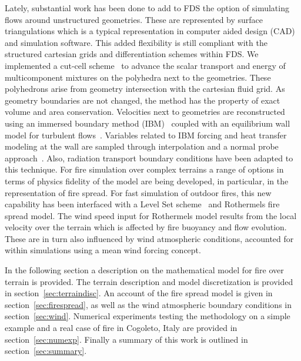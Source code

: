 \documentclass[journal,article,atmosphere,submit,moreauthors,pdftex]{Definitions/mdpi}
\begin{document}
Lately, substantial work has been done to add to FDS the option of simulating flows around unstructured geometries. These are represented by surface triangulations which is a typical representation in computer aided design (CAD) and simulation software. This added flexibility is still compliant with the structured cartesian grids and differentiation schemes within FDS. We implemented a cut-cell scheme~\cite{berger_2016} to advance the scalar transport and energy of multicomponent mixtures on the polyhedra next to the geometries. These polyhedrons arise from geometry intersection with the cartesian fluid grid. As geometry boundaries are not changed, the method has the property of exact volume and area conservation. Velocities next to geometries are reconstructed using an immersed boundary method (IBM)~\cite{fadlun_2000,balaras_2004} coupled with an equilibrium wall model for turbulent flows~\cite{mcdermo_2018}. Variables related to IBM forcing and heat transfer modeling at the wall are sampled through interpolation and a normal probe approach~\cite{balaras_2004}. Also, radiation transport boundary conditions have been adapted to this technique. 
For fire simulation over complex terrains a range of options in terms of physics fidelity of the model are being developed, in particular, in the representation of fire spread. For fast simulation of outdoor fires, this new capability has been interfaced with a Level Set scheme~\cite{Bova:IJWF2015} and Rothermels fire spread model. The wind speed input for Rothermels model results from the local velocity over the terrain which is affected by fire buoyancy and flow evolution. These are in turn also influenced by wind atmospheric conditions, accounted for within simulations using a mean wind forcing concept.  

In the following section a description on the mathematical model for fire over terrain is provided. The terrain description and model discretization is provided in section~\ref{sec:terraindisc}. An account of the fire spread model is given in section~\ref{sec:firespread}, as well as the wind atmospheric boundary conditions in section~\ref{sec:wind}. Numerical experiments testing the methodology on a simple example and a real case of fire in Cogoleto, Italy are provided in section~\ref{sec:numexp}. Finally a summary of this work is outlined in section~\ref{sec:summary}.
\end{document}
